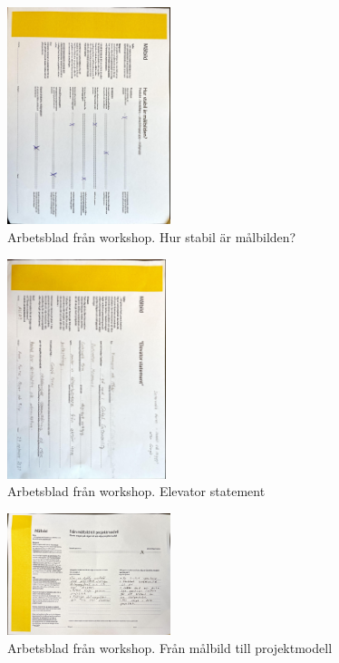 \documentclass[12pt]{article}
\begin{document}
\begin{figure}[htp]
    \centering
    \includegraphics[width = 180px,angle=90]{SM.jpg}
    \caption{Arbetsblad från workshop. Hur stabil är målbilden?}
    \label{fig:Bilaga målbild}
\end{figure}

\begin{figure}[htp]
    \centering
    \includegraphics[width = 175px,angle=90]{Elev.jpg}
    \caption{Arbetsblad från workshop. Elevator statement}
    \label{fig:Elevator statement}
\end{figure}

\begin{figure}[htp]
    \centering
    \includegraphics[width = 180px,angle=90]{MP.jpg}
    \caption{Arbetsblad från workshop. Från målbild till projektmodell}
    \label{fig:Bilaga projektmodelll}
\end{figure}






\end{document}
